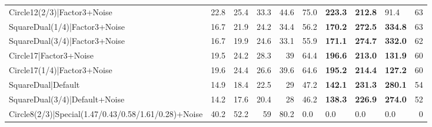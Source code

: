 \begin{tabular}{lrrrrllllr}
 Circle12(2/3)|Factor3+Noise                          &         22.8 &         25.4 &         33.3 &            44.6 & 75.0           & \textbf{223.3} & \textbf{212.8} & 91.4           &           63 \\
 SquareDual(1/4)|Factor3+Noise                        &         16.7 &         21.9 &         24.2 &            34.4 & 56.2           & \textbf{170.2} & \textbf{272.5} & \textbf{334.8} &           63 \\
 SquareDual(3/4)|Factor3+Noise                        &         16.7 &         19.9 &         24.6 &            33.1 & 55.9           & \textbf{171.1} & \textbf{274.7} & \textbf{332.0} &           62 \\
 Circle17|Factor3+Noise                               &         19.5 &         24.2 &         28.3 &            39   & 64.4           & \textbf{196.6} & \textbf{213.0} & \textbf{131.9} &           60 \\
 Circle17(1/4)|Factor3+Noise                          &         19.6 &         24.4 &         26.6 &            39.6 & 64.6           & \textbf{195.2} & \textbf{214.4} & \textbf{127.2} &           60 \\
 SquareDual|Default                                   &         14.9 &         18.4 &         22.5 &            29   & 47.2           & \textbf{142.1} & \textbf{231.3} & \textbf{280.1} &           54 \\
 SquareDual(3/4)|Default+Noise                        &         14.2 &         17.6 &         20.4 &            28   & 46.2           & \textbf{138.3} & \textbf{226.9} & \textbf{274.0} &           52 \\
 Circle8(2/3)|Special(1.47/0.43/0.58/1.61/0.28)+Noise &         40.2 &         52.2 &         59   &            80.2 & 0.0            & 0.0            & 0.0            & 0.0            &            0 \\
\hline
\end{tabular}